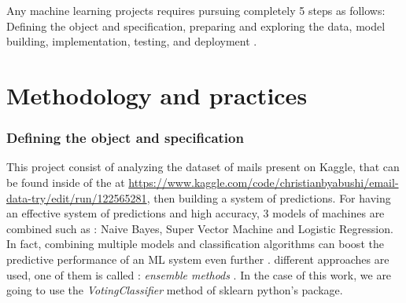 \documentclass[12pt,a4paper]{article}
\begin{document}
Any machine learning projects requires pursuing completely 5 steps as follows: Defining the object and specification, preparing and exploring the data, model building, implementation, testing, and deployment \cite{mlwithpython}. \\
\part{Methodology and practices}
\section{Defining the object and specification} 
This project consist of analyzing the dataset of mails present on Kaggle, that can be found inside of the at \url{https://www.kaggle.com/code/christianbyabushi/email-data-try/edit/run/122565281}, then building a system of predictions. 
For having an effective system of predictions and high accuracy, 3 models of machines are combined such as : Naive Bayes, Super Vector Machine and Logistic Regression. 
\\
In fact, combining multiple models and classification algorithms can boost the predictive
performance of an ML system even further \cite{raschka2017python}. different approaches are used, one of them is called : \textit{ensemble methods} . In the case of this work, we are going to use the \textit{VotingClassifier} method of sklearn python's package.
\end{document}
